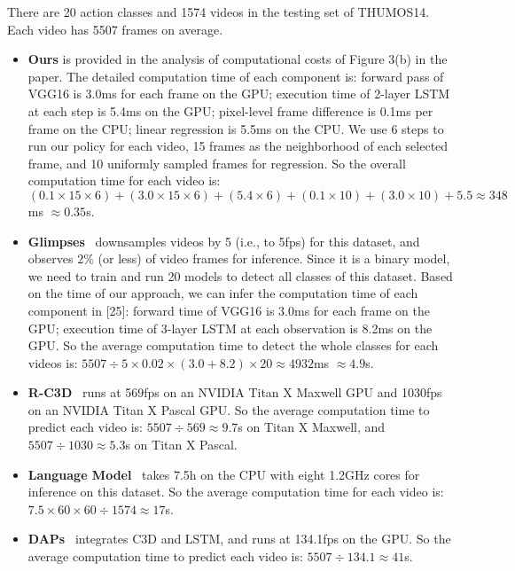 \documentclass{bmvc2k}
\begin{document}
There are 20 action classes and 1574 videos in the testing set of THUMOS14. Each video has 5507 frames on average. 

\begin{itemize}
\item \textbf{Ours} is provided in the analysis of computational costs of Figure 3(b) in the paper. The detailed computation time of each component is: forward pass of VGG16 is 3.0ms for each frame on the GPU; execution time of 2-layer LSTM at each step is 5.4ms on the GPU; pixel-level frame difference is 0.1ms per frame on the CPU; linear regression is 5.5ms on the CPU. We use 6 steps to run our policy for each video, 15 frames as the neighborhood of each selected frame, and 10 uniformly sampled frames for regression. So the overall computation time for each video is: $(0.1\times15\times6) + (3.0\times15\times6) + (5.4\times6) + (0.1\times10) + (3.0\times10) + 5.5 \approx 348$ms $\approx 0.35$s. 

\item \textbf{Glimpses}~\cite{yeung2015end}  downsamples videos by 5 (i.e., to 5fps) for this dataset, and observes $2\%$ (or less) of video frames for inference. Since it is a binary model, we need to train and run 20 models to detect all classes of this dataset. Based on the time of our approach, we can infer the computation time of each component in [25]: forward time of VGG16 is 3.0ms for each frame on the GPU; execution time of 3-layer LSTM at each observation is 8.2ms on the GPU. So the average computation time to detect the whole classes for each videos is: $5507 \div 5 \times 0.02 \times (3.0 + 8.2) \times 20 \approx 4932$ms $\approx 4.9$s.

\item \textbf{R-C3D}~\cite{r-c3d} runs at 569fps on an NVIDIA Titan X Maxwell GPU and 1030fps on an NVIDIA Titan X Pascal GPU. So the average computation time to predict each video is: $5507 \div 569 \approx 9.7$s on Titan X Maxwell, and $5507 \div 1030 \approx 5.3$s on Titan X Pascal.

\item \textbf{Language Model}~\cite{language-model} takes 7.5h on the CPU with eight 1.2GHz cores for inference on this dataset. So the average computation time for each video is: $7.5 \times 60 \times 60 \div 1574 \approx 17$s. 

\item \textbf{DAPs}~\cite{daps} integrates C3D and LSTM, and runs at 134.1fps on the GPU. So the average computation time to predict each video is: $5507 \div 134.1 \approx 41$s.


\end{itemize}
\end{document}
